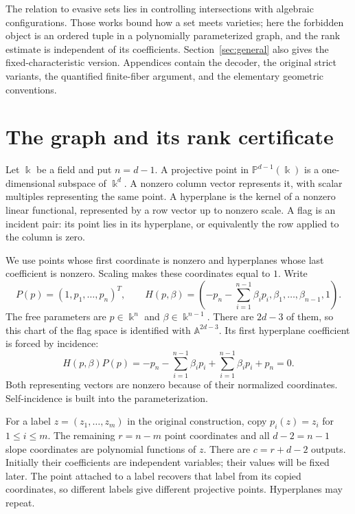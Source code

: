 \documentclass[11pt,a4paper]{article}
\newcommand{\A}{\mathbb A}
\newcommand{\PP}{\mathbb P}
\theoremstyle{definition}
\theoremstyle{remark}
\numberwithin{equation}{section}
\begin{document}
The relation to evasive sets \cite{DKL,LNZ} lies in controlling intersections with algebraic configurations. Those works bound how a set meets varieties; here the forbidden object is an ordered tuple in a polynomially parameterized graph, and the rank estimate is independent of its coefficients. Section~\ref{sec:general} also gives the fixed-characteristic version. Appendices contain the decoder, the original strict variants, the quantified finite-fiber argument, and the elementary geometric conventions.

\section{The graph and its rank certificate}\label{sec:rank}
Let $\Bbbk$ be a field and put $n=d-1$. A projective point in $\PP^{d-1}(\Bbbk)$ is a one-dimensional subspace of $\Bbbk^d$. A nonzero column vector represents it, with scalar multiples representing the same point. A hyperplane is the kernel of a nonzero linear functional, represented by a row vector up to nonzero scale. A flag is an incident pair: its point lies in its hyperplane, or equivalently the row applied to the column is zero.

We use points whose first coordinate is nonzero and hyperplanes whose last coefficient is nonzero. Scaling makes these coordinates equal to $1$. Write
\begin{equation}\label{eq:chart}
P(p)=(1,p_1,\ldots,p_n)^T,\qquad
H(p,\beta)=\left(-p_n-\sum_{i=1}^{n-1}\beta_i p_i,\beta_1,\ldots,\beta_{n-1},1\right).
\end{equation}
The free parameters are $p\in\Bbbk^n$ and $\beta\in\Bbbk^{n-1}$. There are $2d-3$ of them, so this chart of the flag space is identified with $\A^{2d-3}$. Its first hyperplane coefficient is forced by incidence:
\[
H(p,\beta)P(p)=-p_n-\sum_{i=1}^{n-1}\beta_i p_i+\sum_{i=1}^{n-1}\beta_i p_i+p_n=0.
\]
Both representing vectors are nonzero because of their normalized coordinates. Self-incidence is built into the parameterization.

For a label $z=(z_1,\ldots,z_m)$ in the original construction, copy $p_i(z)=z_i$ for $1\le i\le m$. The remaining $r=n-m$ point coordinates and all $d-2=n-1$ slope coordinates are polynomial functions of $z$. There are $c=r+d-2$ outputs. Initially their coefficients are independent variables; their values will be fixed later. The point attached to a label recovers that label from its copied coordinates, so different labels give different projective points. Hyperplanes may repeat.
\end{document}
